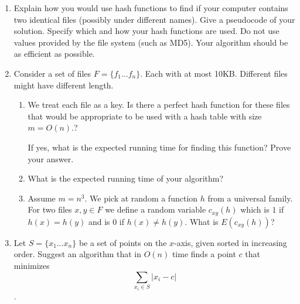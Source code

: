 \documentclass[11pt,epic,leqno,eepic,psfig,]{article}
\renewcommand{\i}{\item}
\begin{document}
\renewcommand{\i}{\item}

 
 \everymath{\color{blue}}
 

\def\polylog{{{\sl polylog }}}
\def\poly{{{\sl poly }}}





\newpage 






   
\begin{enumerate}


 
 \item Explain how you would use hash functions to find if your computer  contains two identical  files  (possibly under different names).   Give a     pseudocode of your solution.    Specify which and how your hash functions are used. Do not use  values provided by the file system (such as MD5). Your algorithm should be as efficient as possible. 
 
\i 
 Consider a set of files $F=\{f_1\dots f_n\}$. Each with at most 10KB. Different files might have different length. 

\begin{enumerate}
    \item We treat each file as a key. 
    Is there a perfect hash function for these  files   {\color{purple}  that would be appropriate to be used with a hash table with size $m=O(n)$.?} 
    
    If yes, what is the expected running time for finding this function? Prove your answer. 
    

    
    \i What is the expected  running time of your algorithm? 
    
    
    \i Assume $m=n^3$. We pick at random a function $h$ from a universal family. For two files $x, y\in F$ we 
    define a random variable $c_{xy}(h)$ which is $1$ if $h(x)=h(y)$ and is $0$ if $h(x)\neq h(y)$. What is $E(c_{xy}(h))$?
\end{enumerate}







\i Let $S=\{x_1\dots x_n\}$ be a set of points on the $x$-axis, given sorted in increasing order. Suggest an algorithm that in $O(n)$ time finds a point $c$ that minimizes 
$$\sum_{x_i\in S} |x_i-c|$$. 


\end{enumerate}
\end{document}

